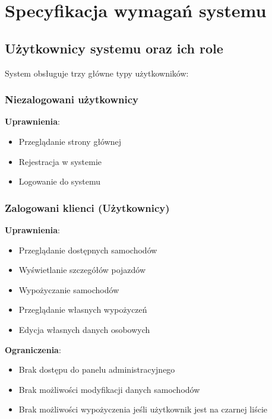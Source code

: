 \documentclass[12pt,a4paper]{article}
\begin{document}
\newpage

\section{Specyfikacja wymagań systemu}

\subsection{Użytkownicy systemu oraz ich role}

System obsługuje trzy główne typy użytkowników:

\subsubsection{Niezalogowani użytkownicy}
\textbf{Uprawnienia}:
\begin{itemize}
    \item Przeglądanie strony głównej
    \item Rejestracja w systemie
    \item Logowanie do systemu
\end{itemize}

\subsubsection{Zalogowani klienci (Użytkownicy)}
\textbf{Uprawnienia}:
\begin{itemize}
    \item Przeglądanie dostępnych samochodów
    \item Wyświetlanie szczegółów pojazdów
    \item Wypożyczanie samochodów
    \item Przeglądanie własnych wypożyczeń
    \item Edycja własnych danych osobowych
\end{itemize}

\textbf{Ograniczenia}:
\begin{itemize}
    \item Brak dostępu do panelu administracyjnego
    \item Brak możliwości modyfikacji danych samochodów
    \item Brak możliwości wypożyczenia jeśli użytkownik jest na czarnej liście
\end{itemize}
\end{document}
